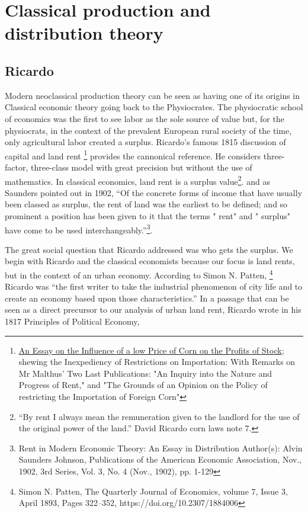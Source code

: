 \section{Classical production and distribution theory}


 \subsection{Ricardo}



Modern neoclassical production theory can be seen as having one of its origins in  Classical economic theory going back to the Physiocrates. The physiocratic school of economics was the first to see labor as the sole source of value but, for the physiocrats, in the context of the prevalent European rural society of the time, only agricultural labor created a surplus. Ricardo's famous 1815 discussion of capital and  land rent \footnote{\href{http://la.utexas.edu/users/hcleaver/368/368RicardoOnCornLaws.html}{An Essay on the Influence of a low Price of Corn on the Profits of Stock}; shewing the Inexpediency of Restrictions on Importation: With Remarks on Mr Malthus' Two Last Publications: "An Inquiry into the Nature and Progress of Rent," and "The Grounds of an Opinion on the Policy of restricting the Importation of Foreign Corn" } 
provides the cannonical reference. He considers three-factor, three-class model with great precision but without the use of mathematics.   
In classical economics, land rent is a surplus value\footnote{``By rent I always mean the remuneration given to the landlord for the use of the original power of the land.'' David Ricardo corn laws note 7.}. 
and as Saunders pointed out in 1902, ``Of the concrete forms of income that have usually been classed as surplus, the rent of land was the earliest to be defined; and so prominent a position has been given to it that the terms " rent" and " surplus" have come to be used interchangeably.''\footnote{Rent in Modern Economic Theory: An Essay in Distribution Author(s): Alvin Saunders Johnson, Publications of the American Economic Association, Nov., 1902, 3rd Series, Vol. 3, No. 4 (Nov., 1902), pp. 1-129}. 

The great social question that Ricardo addressed  was who gets the surplus. %
We begin with Ricardo and the classical economists because our focus is land rents, but in the context of an urban economy. According to Simon N. Patten, \footnote{Simon N. Patten,  The Quarterly Journal of Economics, volume 7, Issue 3, April 1893, Pages 322–352, https://doi.org/10.2307/1884006 }  Ricardo was ``the first writer to take the industrial phenomenon of city life and to create an economy based upon those characteristics.'' %
In a passage that can be seen as a direct precursor to our analysis of urban land rent, Ricardo  wrote in his 1817 Principles of Political Economy, %


